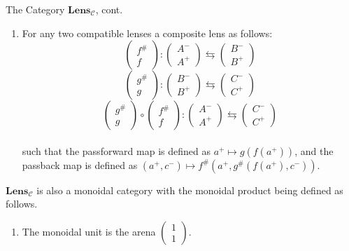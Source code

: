 \documentclass[12pt]{article}
\begin{document}
\begin{definition*}{The Category $\textbf{Lens}_\mathcal{C}$, cont.}{}
    \begin{enumerate}\addtocounter{enumi}{3}
        \item For any two compatible lenses a composite lens as follows:
              $$\begin{pmatrix}f^{\#}\\f\end{pmatrix}:\begin{pmatrix}A^-\\A^+\end{pmatrix}\leftrightarrows\begin{pmatrix}B^-\\B^+\end{pmatrix}$$
              $$\begin{pmatrix}g^{\#}\\g\end{pmatrix}:\begin{pmatrix}B^-\\B^+\end{pmatrix}\leftrightarrows\begin{pmatrix}C^-\\C^+\end{pmatrix}$$
              $$\begin{pmatrix}g^{\#}\\g\end{pmatrix} \circ \begin{pmatrix}f^{\#}\\f\end{pmatrix}:\begin{pmatrix}A^-\\A^+\end{pmatrix}\leftrightarrows\begin{pmatrix}C^-\\C^+\end{pmatrix}$$
              \\such that the passforward map is defined as $a^+ \mapsto g(f(a^+))$,
              and the passback map is defined as $(a^+, c^-) \mapsto f^\#(a^+, g^\#(f(a^+), c^-))$.
    \end{enumerate}
    $\textbf{Lens}_{\mathcal{C}}$ is also a monoidal category with the monoidal product being defined as follows.
    \begin{enumerate}
        \item The monoidal unit is the arena $\begin{pmatrix}1\\1\end{pmatrix}$.

\end{enumerate}
\end{definition*}
\end{document}
